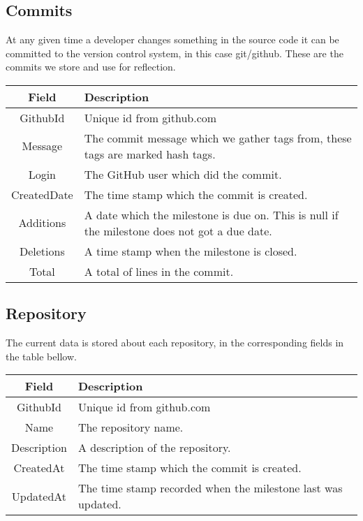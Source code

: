 \subsection*{Commits}
At any given time a developer changes something in the source code it can be committed to the version control system, in this case git/github. These are the commits we store and use for reflection. \\

\vspace{0.5cm}
\begin{tabularx}{\linewidth}{| c | X |}
    \hline
    \rowcolor[gray]{0.8}
    \textbf{Field} & \textbf{Description} \\
    \hline
    GithubId & Unique id from github.com\\ \hline
    Message & The commit message which we gather tags from, these tags are marked hash tags.\\ \hline
   	Login & The GitHub user which did the commit.\\ \hline
    CreatedDate & The time stamp which the commit is created.\\ \hline
    Additions & A date which the milestone is due on. This is null if the milestone does not got a due date.\\ \hline
    Deletions & A time stamp when the milestone is closed.\\ \hline
    Total & A total of lines in the commit.\\
    \hline
\end{tabularx}
\vspace{0.5cm}

\subsection*{Repository}
The current data is stored about each repository, in the corresponding fields in the table bellow. \\

\vspace{0.5cm}
\begin{tabularx}{\linewidth}{| c | X |}
    \hline
    \rowcolor[gray]{0.8}
    \textbf{Field} & \textbf{Description} \\
    \hline
    GithubId & Unique id from github.com\\ \hline
    Name & The repository name.\\ \hline
   	Description & A description of the repository.\\ \hline
    CreatedAt & The time stamp which the commit is created.\\ \hline
    UpdatedAt & The time stamp recorded when the milestone last was updated.\\ 
    \hline
\end{tabularx}
\vspace{0.5cm}

